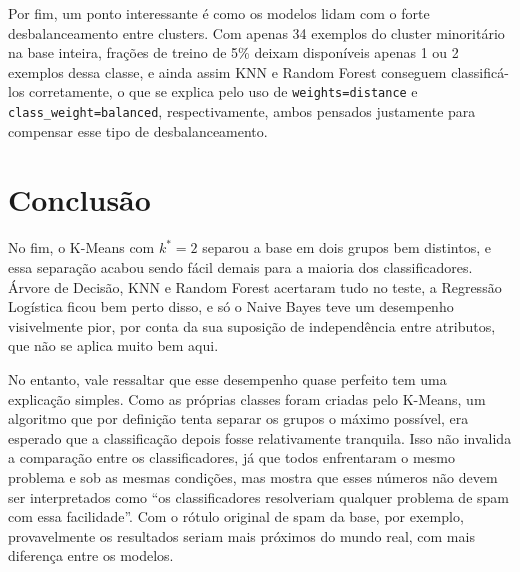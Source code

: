 \documentclass[a4paper,10pt]{article}
\begin{document}
Por fim, um ponto interessante é como os modelos lidam com o forte desbalanceamento entre clusters. Com apenas 34 exemplos do cluster minoritário na base inteira, frações de treino de 5\% deixam disponíveis apenas 1 ou 2 exemplos dessa classe, e ainda assim KNN e Random Forest conseguem classificá-los corretamente, o que se explica pelo uso de \texttt{weights=distance} e \texttt{class\_weight=balanced}, respectivamente, ambos pensados justamente para compensar esse tipo de desbalanceamento.

\section{Conclusão}

No fim, o K-Means com $k^{*}=2$ separou a base em dois grupos bem distintos, e essa separação acabou sendo fácil demais para a maioria dos classificadores. Árvore de Decisão, KNN e Random Forest acertaram tudo no teste, a Regressão Logística ficou bem perto disso, e só o Naive Bayes teve um desempenho visivelmente pior, por conta da sua suposição de independência entre atributos, que não se aplica muito bem aqui.

No entanto, vale ressaltar que esse desempenho quase perfeito tem uma explicação simples. Como as próprias classes foram criadas pelo K-Means, um algoritmo que por definição tenta separar os grupos o máximo possível, era esperado que a classificação depois fosse relativamente tranquila. Isso não invalida a comparação entre os classificadores, já que todos enfrentaram o mesmo problema e sob as mesmas condições, mas mostra que esses números não devem ser interpretados como ``os classificadores resolveriam qualquer problema de spam com essa facilidade''. Com o rótulo original de spam da base, por exemplo, provavelmente os resultados seriam mais próximos do mundo real, com mais diferença entre os modelos.
\end{document}

